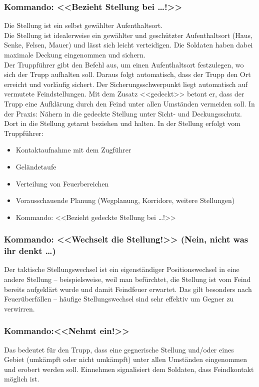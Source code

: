 \subsubsection{Kommando: <<Bezieht Stellung bei …!>>}
Die Stellung ist ein selbst gewählter Aufenthaltsort. \\
Die Stellung ist idealerweise ein gewählter und geschützter Aufenthaltsort (Haus, Senke, Felsen, Mauer) und lässt sich leicht verteidigen. Die Soldaten haben dabei maximale Deckung eingenommen und sichern. \\
Der Truppführer gibt den Befehl aus, um einen Aufenthaltsort festzulegen, wo sich der Trupp aufhalten soll. Daraus folgt automatisch, dass der Trupp den Ort erreicht und vorläufig sichert. Der Sicherungsschwerpunkt liegt automatisch auf vermutete Feindstellungen. Mit dem Zusatz <<gedeckt>> betont er, dass der Trupp eine Aufklärung durch den Feind unter allen Umständen vermeiden soll. In der Praxis: Nähern in die gedeckte Stellung unter Sicht- und Deckungsschutz. Dort in die Stellung getarnt beziehen und halten. In der Stellung erfolgt vom Truppführer:
\begin{itemize}
\item Kontaktaufnahme mit dem Zugführer 
\item Geländetaufe 
\item Verteilung von Feuerbereichen 
\item Vorausschauende Planung (Wegplanung, Korridore, weitere Stellungen) 
\item Kommando: <<Bezieht gedeckte Stellung bei …!>> 
\end{itemize}
\subsubsection{Kommando: <<Wechselt die Stellung!>> (Nein, nicht was ihr denkt …)}
Der taktische Stellungswechsel ist ein eigenständiger Positionswechsel in eine andere Stellung – beispielsweise, weil man befürchtet, die Stellung ist vom Feind bereits aufgeklärt wurde und damit Feindfeuer erwartet. Das gilt besonders nach Feuerüberfällen – häufige Stellungswechsel sind sehr effektiv um Gegner zu verwirren. \\
\subsubsection{Kommando:<<Nehmt ein!>>}
Das bedeutet für den Trupp, dass eine gegnerische Stellung und/oder eines Gebiet (umkämpft oder nicht umkämpft) unter allen Umständen eingenommen und erobert werden soll. Einnehmen signalisiert dem Soldaten, dass Feindkontakt möglich ist. \\
